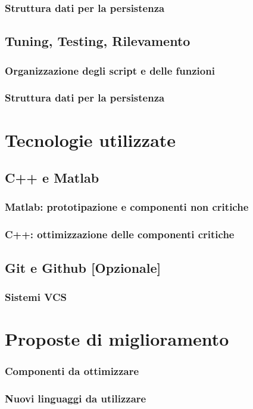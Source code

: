             \subsubsection{Struttura dati per la persistenza}
        \subsection{Tuning, Testing, Rilevamento}
            \subsubsection{Organizzazione degli script e delle funzioni}
            \subsubsection{Struttura dati per la persistenza}
    \section{Tecnologie utilizzate}
        \subsection{C++ e Matlab}
            \subsubsection{Matlab: prototipazione e componenti non critiche}
            \subsubsection{C++: ottimizzazione delle componenti critiche}
        \subsection{Git e Github [Opzionale]}
            \subsubsection{Sistemi VCS}
    \section{Proposte di miglioramento}
        \subsubsection{Componenti da ottimizzare}
        \subsubsection{Nuovi linguaggi da utilizzare}